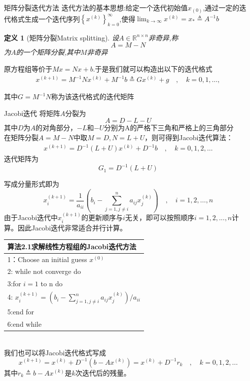 \documentclass[notheorems,serif]{beamer}
\newcommand{\hei}[1]{{\HEI#1}}
\newtheorem{definition}{\hei{定义}}
\begin{document}
\begin{frame}
{矩阵分裂迭代方法}
迭代方法的基本思想:给定一个迭代初始值$x_{(0)}$,通过一定的迭代格式生成一个迭代序列$\left\{x^{(k)}\right\}_{k=0}^{\infty}$,使得$\lim _{k \rightarrow \infty} x^{(k)}=x_{*} \triangleq A^{-1} b$
\begin{definition}[矩阵分裂Matrix splitting]
设$A \in \mathbb{R}^{n \times n}$非奇异,称
$$
A=M-N
$$
为$A$的一个矩阵分裂,其中$M$非奇异
\end{definition}

原方程组等价于$M x=N x+b$.于是我们就可以构造出以下的迭代格式
\begin{align}
x^{(k+1)}=M^{-1} N x^{(k)}+M^{-1} b \triangleq G x^{(k)}+g \quad, \quad k=0,1, \ldots,\tag{6.7}
\end{align}

其中$G=M^{-1} N$称为该迭代格式的{\color{blue}迭代矩阵}
\end{frame}

\begin{frame}
{Jacobi迭代}
将矩阵$A$分裂为$$A=D-L-U$$
其中$D$为$A$的对角部分，$-L$和$-U$分别为A的严格下三角和严格上的三角部分\\
在矩阵分裂$A=M-N$中取$M=D, N=L+U$，则可得到{\color{blue}Jacobi迭代}算法：
\begin{align}
x^{(k+1)}=D^{-1}(L+U) x^{(k)}+D^{-1} b \quad, \quad k=0,1,2, \ldots
\tag{6.8}
\end{align}
迭代矩阵为
$$
G_{1}=D^{-1}(L+U)
$$
\end{frame}

\begin{frame}

写成分量形式即为
$$
x_{i}^{(k+1)}=\frac{1}{a_{i i}}\left(b_{i}-\sum_{j=1, j \neq i}^{n} a_{i j} x_{j}^{(k)}\right) \quad, \quad i=1,2, \ldots, n
$$
由于Jacobi迭代中$x_i^{(k+1)}$的更新顺序与$i$无关，即可以按照顺序$i=1,2,...,n$计算。因此Jacobi迭代非常适合并行计算。
\end{frame}

\begin{frame}
\begin{tabular}{l}
\hline
{\color{blue}算法2.1}求解线性方程组的Jacobi迭代方法\\
\hline
1：Choose an initial guess $x^{(0)}$\\
2: while not converge do\\
3:\qquad for $i=1$ to n do\\
4:\qquad \qquad
$
x_{i}^{(k+1)}=\left(b_{i}-\sum_{j=1, j \neq i}^{n} a_{i j} x_{j}^{(k)}\right) / a_{i i}
$\\
5:\qquad end for\\
6:end while\\
\hline
\end{tabular}\\
我们也可以将Jacobi迭代格式写成\\
$$
x^{(k+1)}=x^{(k)}+D^{-1}\left(b-A x^{(k)}\right)=x^{(k)}+D^{-1} r_{k} \quad, \quad k=0,1,2, \ldots
$$
其中$r_{k} \triangleq b-A x^{(k)}$是$k$次迭代后的残量。\\
\end{frame}
\end{document}
